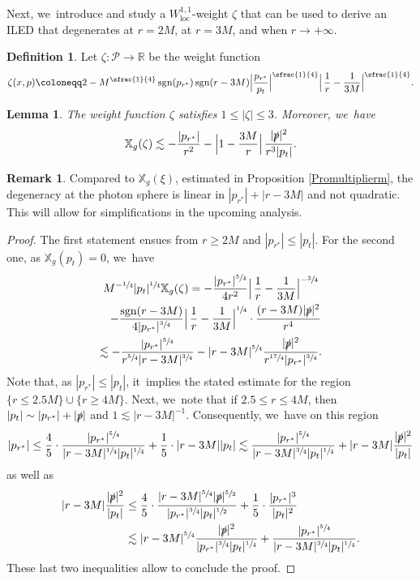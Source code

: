 \documentclass[JEP,XML,SOM,Unicode,published]{cedram}
\DeclareMathOperator{\sgn}{sgn}
\theoremstyle{plain}
\newtheorem{lemma}[proposition]{Lemma}
\theoremstyle{definition}
\newtheorem{definition}[proposition]{Definition}
\newtheorem{remark}[proposition]{Remark}
\newcommand\R{{\mathbb{R}}}
\newcommand\z{{\zeta}}
\newcommand\T{{\mathbb{X}}}
\begin{document}
Next, we~introduce and study a $W^{1,1}_{\mathrm{loc}}$-weight $\zeta$ that can be used to derive an ILED that degenerates at $r=2M$, at $r=3M$, and when $r \to +\infty$.
\begin{definition}\label{Defz}
Let $\z \colon \mathcal{P}\to \R$ be the weight function
\[
\z(x,p) \coloneqq 2 -M^{\sfrac{1}{4}} \sgn(p_{r^*}) \sgn(r-3M) \Big|\frac{p_{r^*}}{p_t} \Big|^{\sfrac{1}{4}}\Big| \, \frac{1}{r} -\frac{1}{3M} \Big|^{\sfrac{1}{4}}.
\]
\end{definition}
\begin{lemma}\label{LemPropz}
The weight function $\z$ satisfies $1 \leq |\z| \leq 3$. Moreover, we~have
\[
\T_g (\z) \lesssim - \frac{|p_{r^*}|}{r^2}-\Big| 1-\frac{3M}{r} \Big| \, \frac{|\slashed{p}|^2}{r^3|p_t|}.
\]
\end{lemma}
\begin{remark}
Compared to $\T_g(\xi)$, estimated in Proposition \ref{Promultiplierm}, the degeneracy at the photon sphere is linear in $|p_{r^*}|+|r-3M|$ and not quadratic. This will allow for simplifications in the upcoming analysis.
\end{remark}
\begin{proof}
The first statement ensues from $r \geq 2M$ and $|p_{r^*}| \leq |p_t|$. For the second one, as $\T_g(p_t)=0$, we~have
\begin{multline*}
M^{-\sfrac{1}{4}}|p_t|^{\sfrac{1}{4}} \T_g (\z) =- \frac{ |p_{r^*}|^{\sfrac{5}{4}}}{4r^2}\Big| \, \frac{1}{r} -\frac{1}{3M} \Big|^{-\sfrac{3}{4}}\\
\hspace*{3mm}-\frac{\sgn(r-3M)}{4|p_{r^*}|^{\sfrac{3}{4}}}\Big| \, \frac{1}{r} -\frac{1}{3M} \Big|^{\sfrac{1}{4}} \cdot \frac{(r-3M)|\slashed{p}|^2}{r^4} \\
 \lesssim -\frac{|p_{r^*}|^{\sfrac{5}{4}}}{r^{\sfrac{5}{4}} |r-3M|^{\sfrac{3}{4}}}-|r-3M|^{\sfrac{5}{4}}\frac{|\slashed{p}|^2}{r^{\sfrac{17}{4}}|p_{r^*}|^{\sfrac{3}{4}}}.
\end{multline*}
Note that, as $|p_{r^*}| \leq |p_t|$, it~implies the stated estimate for the region $ \{r \leq 2.5M \} \cup \{ r \geq 4M \}$. Next, we~note that if $2.5 \leq r \leq 4M$, then $|p_t| \sim |p_{r^*}|+|\slashed{p}|$ and $1 \lesssim |r-3M|^{-1}$. Consequently, we~have on this region
\[
|p_{r^*}| \leq \frac{4}{5} \cdot \frac{|p_{r^*}|^{\sfrac{5}{4}}}{|r-3M|^{\sfrac{1}{4}}|p_t|^{\sfrac{1}{4}}}+\frac{1}{5}\cdot |r-3M||p_t| \lesssim \frac{|p_{r^*}|^{\sfrac{5}{4}}}{ |r-3M|^{\sfrac{3}{4}}|p_t|^{\sfrac{1}{4}}} + |r-3M|\frac{|\slashed{p}|^2}{|p_t|}
\]
as well as
\begin{align*}
|r-3M|\frac{|\slashed{p}|^2}{|p_t|} &\leq \frac{4}{5} \cdot \frac{|r-3M|^{\sfrac{5}{4}} |\slashed{p}|^{\sfrac{5}{2}}}{|p_{r^*}|^{\sfrac{3}{4}}|p_t|^{\sfrac{1}{2}}}+\frac{1}{5}\cdot \frac{|p_{r^*}|^3}{|p_t|^2}\\
&\lesssim |r-3M|^{\sfrac{5}{4}}\frac{|\slashed{p}|^2}{|p_{r^*}|^{\sfrac{3}{4}}|p_t|^{\sfrac{1}{4}}}+ \frac{|p_{r^*}|^{\sfrac{5}{4}}}{ |r-3M|^{\sfrac{3}{4}}|p_t|^{\sfrac{1}{4}}}.
\end{align*}
These last two inequalities allow to conclude the proof.
\end{proof}
\end{document}
